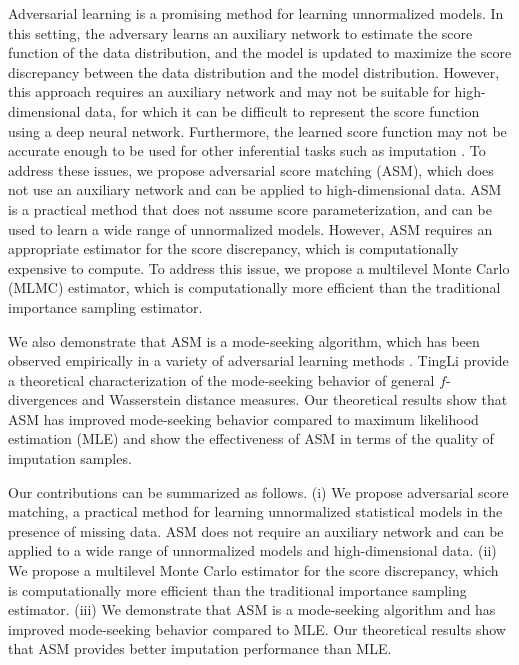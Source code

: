 \documentclass{article} %
\begin{document}
Adversarial learning is a promising method for learning unnormalized models. In this setting, the adversary learns an auxiliary network to estimate the score function of the data distribution, and the model is updated to maximize the score discrepancy between the data distribution and the model distribution. However, this approach requires an auxiliary network and may not be suitable for high-dimensional data, for which it can be difficult to represent the score function using a deep neural network. Furthermore, the learned score function may not be accurate enough to be used for other inferential tasks such as imputation \citep{Uehara2020}. To address these issues, we propose adversarial score matching (ASM), which does not use an auxiliary network and can be applied to high-dimensional data. ASM is a practical method that does not assume score parameterization, and can be used to learn a wide range of unnormalized models. However, ASM requires an appropriate estimator for the score discrepancy, which is computationally expensive to compute. To address this issue, we propose a multilevel Monte Carlo (MLMC) estimator, which is computationally more efficient than the traditional importance sampling estimator.

We also demonstrate that ASM is a mode-seeking algorithm, which has been observed empirically in a variety of adversarial learning methods \citep{Burda2016, Sasaki2014}. TingLi provide a theoretical characterization of the mode-seeking behavior of general $f$-divergences and Wasserstein distance measures. Our theoretical results show that ASM has improved mode-seeking behavior compared to maximum likelihood estimation (MLE) and show the effectiveness of ASM in terms of the quality of imputation samples.

Our contributions can be summarized as follows. (i)  We propose adversarial score matching, a practical method for learning unnormalized statistical models in the presence of missing data. ASM does not require an auxiliary network and can be applied to a wide range of unnormalized models and high-dimensional data. (ii) We propose a multilevel Monte Carlo estimator for the score discrepancy, which is computationally more efficient than the traditional importance sampling estimator. (iii) We demonstrate that ASM is a mode-seeking algorithm and has improved mode-seeking behavior compared to MLE. Our theoretical results show that ASM provides better imputation performance than MLE.
\end{document}
